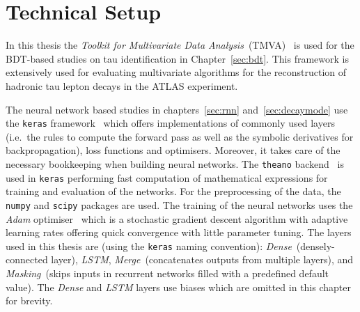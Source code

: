 \section{Technical Setup}
\label{sec:tech_setup}

In this thesis the \emph{Toolkit for Multivariate Data
  Analysis}~(TMVA)~\cite{tmva} is used for the BDT-based studies on tau
identification in Chapter~\ref{sec:bdt}. This framework is extensively used for
evaluating multivariate algorithms for the reconstruction of hadronic tau lepton
decays in the ATLAS experiment.

The neural network based studies in chapters~\ref{sec:rnn}
and~\ref{sec:decaymode} use the \texttt{keras} framework~\cite{keras} which
offers implementations of commonly used layers (i.e.\ the rules to compute the
forward pass as well as the symbolic derivatives for backpropagation), loss
functions and optimisers. Moreover, it takes care of the necessary bookkeeping
when building neural networks. The \texttt{theano} backend~\cite{theano} is used
in \texttt{keras} performing fast computation of mathematical expressions for
training and evaluation of the networks. For the preprocessing of the data, the
\texttt{numpy} \cite{numpy} and \texttt{scipy} \cite{scipy} packages are used.
The training of the neural networks uses the \emph{Adam} optimiser~\cite{adam}
which is a stochastic gradient descent algorithm with adaptive learning rates
offering quick convergence with little parameter tuning. The layers used in this
thesis are (using the \texttt{keras} naming convention):
\emph{Dense}~(densely-connected layer), \emph{LSTM}, \emph{Merge}~(concatenates
outputs from multiple layers), and \emph{Masking}~(skips inputs in recurrent
networks filled with a predefined default value). The \emph{Dense} and
\emph{LSTM} layers use biases which are omitted in this chapter for brevity.

